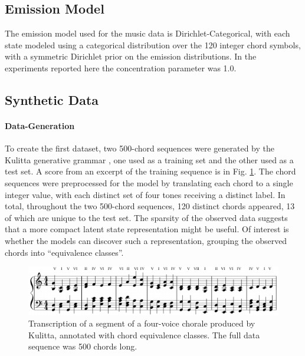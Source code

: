 \subsection{Emission Model}
\label{sec:emission-model}

The emission model used for the music data is Dirichlet-Categorical,
with each state modeled using a categorical distribution over the 120
integer chord symbols, with a symmetric Dirichlet prior on 
the emission distributions.  In the experiments reported here the
concentration parameter was 1.0.

\subsection{Synthetic Data}
\label{sec:data-generation}

\paragraph{Data-Generation}
To create the first dataset, two 500-chord sequences were
generated by the Kulitta generative grammar \cite{quick2014kulitta},
one used as a training set and the other used as a test set.  A score from
an excerpt of the training sequence is in Fig. \ref{fig:music-score}.
The chord sequences were preprocessed for the model by translating
each chord to a single integer value, with each
distinct set of four tones receiving a distinct label.  In total,
throughout the two 500-chord sequences, 120 distinct chords appeared,
13 of which are unique to the test set.
The sparsity of the observed data suggests that a more compact latent
state representation might be useful.  Of interest is whether the models can
discover such a representation, grouping the observed chords into
``equivalence classes''.

\begin{figure}[t]
  \centering
  \includegraphics[width=\textwidth]{fig/music/chord1/chords_annotated.pdf}
  \caption{Transcription of a segment of a four-voice chorale produced
    by Kulitta, annotated with chord equivalence classes.  The full
    data sequence was 500 chords long.}
  \label{fig:music-score}
\end{figure}


